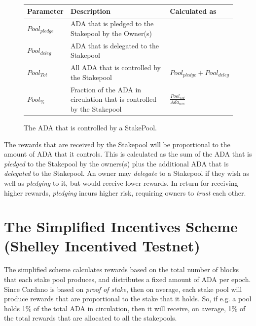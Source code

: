 \documentclass[11pt,a4paper,dvipsnames,twosided,final]{article}
\newcommand{\ada}{ADA{}}
\newcommand{\cardano}[1]{Cardano}
\begin{document}
\begin{figure}[h!]
\begin{center}
\begin{tabular}{||l|p{9cm}|l||}
  \hline \hline
\textbf{Parameter} & \textbf{Description} & \textbf{Calculated as} \\\hline
{\color{red} ${Pool}_\textit{pledge}$} & {\color{red} \ada{} that is pledged to the Stakepool by the Owner(s)} & \\\hline
{\color{blue} ${Pool}_\textit{deleg}$} & {\color{blue}  \ada{} that is delegated to the Stakepool} & \\\hline
${Pool}_{Tot}$ & All \ada{} that is controlled by the Stakepool & ${Pool}_\textit{pledge} + {Pool}_\textit{deleg}$ \\\hline
${Pool}_\%$ & Fraction of the \ada{} in circulation that is controlled by the Stakepool & {\large $\frac{{Pool}_{Tot}}{{Ada}_{circ}}$} \\\hline
  \hline
\end{tabular}
\end{center}
\caption{The \ada{} that is controlled by a StakePool.}
\end{figure}

\noindent
The rewards that are received by the Stakepool will be proportional to the amount of \ada{} that it controls.
This is calculated as the sum of the \ada{} that is \emph{pledged} to the Stakepool by the owners(s) plus
the additional \ada{} that is \emph{delegated} to the Stakepool.  An owner may \emph{delegate} to a Stakepool if
they wish as well as \emph{pledging} to it, but would receive lower rewards.  In return for receiving
higher rewards, \emph{pledging} incurs higher risk, requiring owners to \emph{trust} each other.


\clearpage
\section{The Simplified Incentives Scheme (Shelley Incentived Testnet)}
\label{sec:testnet}

The simplified scheme calculates rewards based on the total number of blocks that each stake pool produces,
and distributes a fixed amount of \ada{} per epoch.
Since \cardano{} is based on \emph{proof of stake}, then on average, each stake pool will produce
rewards that are proportional to the stake that it holds.  So, if e.g. a pool holds 1\% of the total
\ada{} in circulation, then it will receive, on average, 1\% of the total rewards that are allocated to all the
stakepools.
\end{document}
